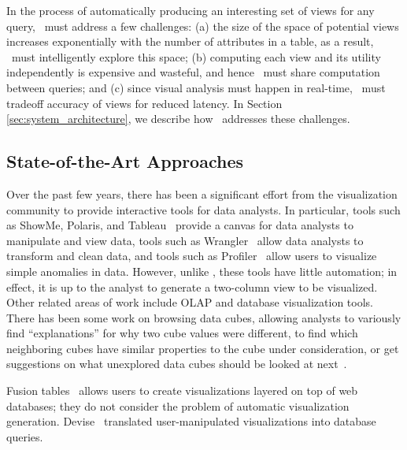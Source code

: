 In the process of automatically producing an interesting set of views for any
query, \SeeDB\ must address a few challenges: (a) the size of
the space of potential views increases exponentially with the number of
attributes in a table, as a result, \SeeDB\ must intelligently explore this
space; (b) computing each view and its utility independently is expensive and
wasteful, and hence \SeeDB\ must share computation between queries; and (c)
since visual analysis must happen in real-time, \SeeDB\ must tradeoff accuracy
of views for reduced latency. In Section \ref{sec:system_architecture}, we
describe how \SeeDB\ addresses these challenges.

\subsection{State-of-the-Art Approaches}
\label{related_work}

Over the past few years, there has been a significant
effort from the visualization community to provide interactive tools
for data analysts. In particular, tools such as ShowMe, Polaris, and
Tableau~\cite{DBLP:journals/cacm/StolteTH08,
  DBLP:journals/tvcg/MackinlayHS07} provide a canvas for data analysts
to manipulate and view data, tools such as
Wrangler~\cite{DBLP:conf/chi/KandelPHH11} allow data analysts to
transform and clean data, and tools such as
Profiler~\cite{DBLP:conf/avi/KandelPPHH12} allow users to visualize
simple anomalies in data.  However, unlike \SeeDB, these tools have
little automation; in effect, it is up to the analyst to generate a
two-column view to be visualized. Other related areas of work include OLAP and
database visualization tools. There has been some work on browsing data cubes, allowing
analysts to variously find ``explanations'' for why two cube values were
different, to find which neighboring cubes have similar properties to the cube
under consideration, or get suggestions on what unexplored data cubes should be
looked at next~\cite{DBLP:conf/vldb/Sarawagi99, DBLP:conf/vldb/SatheS01,
DBLP:conf/vldb/Sarawagi00}.

Fusion tables~\cite{DBLP:conf/sigmod/GonzalezHJLMSSG10} allows users to create
visualizations layered on top of web databases; they do not consider the problem
of automatic visualization generation.
Devise~\cite{DBLP:conf/sigmod/LivnyRBCDLMW97} translated user-manipulated
visualizations into database queries.



